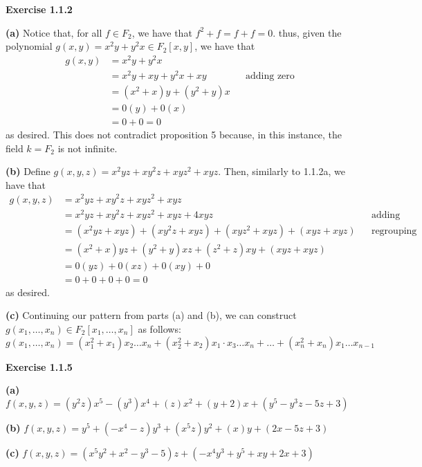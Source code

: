 \documentclass[12pt,oneside]{article}
\newenvironment{exercise}[1]{\vspace{.1in}\noindent\textbf{Exercise #1 \hspace{.05em}}}{}
\begin{document}
\newpage
\begin{exercise}{1.1.2}

    \bigskip
    \textbf{(a)}
    Notice that, for all $f \in F_2$, we have that $f^2 + f = f + f = 0$.
    thus, given the polynomial $g(x,y) = x^2y + y^2x \in F_2[x,y]$, 
    we have that 
    \begin{align*}
        g(x,y)  &= x^2y + y^2x \\
                &= x^2y + xy + y^2x + xy && \text{adding zero}\\
                &= (x^2 + x)y + (y^2 + y)x\\
                &= 0(y) + 0(x)\\
                &= 0 + 0 = 0
    \end{align*}
    as desired. This does not contradict proposition 5 because, in this 
    instance, the field $k = F_2$ is not infinite.

    \bigskip
    \textbf{(b)}
    Define $g(x,y,z) = x^2yz + xy^2z + xyz^2 + xyz$. Then, similarly to 1.1.2a, 
    we have that 
    \begin{align*}
        g(x,y,z)    &= x^2yz + xy^2z + xyz^2 + xyz\\
                    &= x^2yz + xy^2z + xyz^2 + xyz + 4xyz && \text{adding zero}\\
                    &= (x^2yz + xyz) + (xy^2z + xyz) + (xyz^2 + xyz) + (xyz + xyz) && \text{regrouping}\\
                    &= (x^2 + x)yz + (y^2 + y)xz + (z^2 + z)xy + (xyz + xyz)\\
                    &= 0(yz) + 0(xz) + 0(xy) + 0\\
                    &= 0 + 0 + 0 + 0 = 0
    \end{align*}
    as desired.

    \bigskip
    \textbf{(c)}
    Continuing our pattern from parts (a) and (b), we can construct 
    $g(x_1, \ldots, x_n) \in F_2[x_1, \ldots, x_n]$ as follows:
    \[
        g(x_1, \ldots, x_n) = (x_1^2 + x_1)x_2 \ldots x_n + (x_2^2 + x_2)x_1\cdot x_3 \ldots x_n + \ldots + (x_n^2 + x_n)x_1\ldots x_{n-1}
    \]

\end{exercise}

\newpage
\begin{exercise}{1.1.5}

    \bigskip
    \textbf{(a)}
    $f(x,y,z) = (y^2z)x^5 - (y^3)x^4 + (z)x^2 + (y + 2)x + (y^5 - y^3z - 5z + 3)$
    
    \bigskip
    \textbf{(b)}
    $f(x,y,z) = y^5 + (-x^4-z)y^3 + (x^5z)y^2 + (x)y + (2x - 5z + 3)$

    \bigskip
    \textbf{(c)}
    $f(x,y,z) = (x^5y^2 + x^2 - y^3 - 5)z + (-x^4y^3 + y^5 + xy + 2x + 3)$

\end{exercise}
\end{document}
